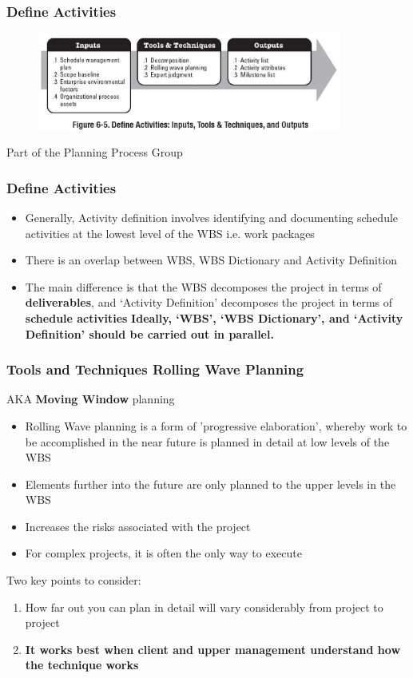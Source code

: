 \begin{frame}
\frametitle{Define Activities}
\begin{figure}
	\centering
		\includegraphics[width = 10cm]{images/Fig6-5.jpg}
	\label{fig:6-5}
\end{figure}
Part of the Planning Process Group
\end{frame}




\begin{frame}
\frametitle{Define Activities}
\begin{itemize}
	\item Generally, Activity definition involves identifying and documenting schedule activities at the lowest level of the WBS  i.e. work packages
	\item There is an overlap between WBS, WBS Dictionary and Activity Definition
	\item The main difference is that the WBS decomposes the project in terms of \textbf{deliverables}, and `Activity Definition' decomposes the project in terms of \textbf{schedule activities}
\textbf{Ideally, `WBS', `WBS Dictionary', and `Activity Definition' should be carried out in parallel.}
\end{itemize}
\end{frame}




\begin{frame}
\frametitle{Tools and Techniques \hfill Rolling Wave Planning}
AKA \textbf{Moving Window} planning
\begin{itemize}
	\item Rolling Wave planning is a form of 'progressive elaboration', whereby work to be accomplished in the near future is planned in detail at low levels of the WBS
	\item Elements further into the future are only planned to the upper levels in the WBS 
	\item Increases the risks associated with the project
	\item For complex projects, it is often the only way to execute
\end{itemize}

Two key points to consider:
\begin{enumerate}
	\item How far out you can plan in detail will vary considerably from project to project
	\item \textbf{It works best when client and upper management understand how the technique works} 
\end{enumerate}
\end{frame}




